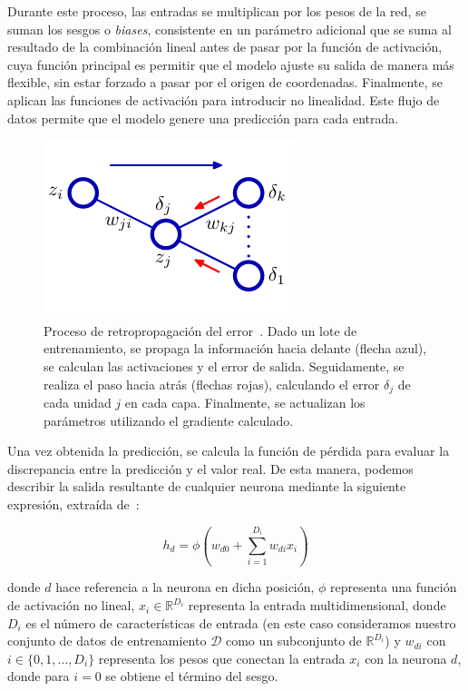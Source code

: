 Durante este proceso, las entradas se multiplican por los pesos de la red, se suman los sesgos o \emph{biases}, consistente en un parámetro adicional que se suma al resultado de la combinación lineal antes de pasar por la función de activación, cuya función principal es permitir que el modelo ajuste su salida de manera más flexible, sin estar forzado a pasar por el origen de coordenadas. Finalmente, se aplican las funciones de activación para introducir no linealidad. Este flujo de datos permite que el modelo genere una predicción para cada entrada.\newline

\begin{figure}[h]
    \centering
    \includegraphics[width=0.3\linewidth]{img/aprendizajegd.png}
    \caption[Proceso de retropropagación del error~\cite{Bishop2006}.]{Proceso de retropropagación del error~\cite{Bishop2006}. Dado un lote de entrenamiento, se propaga la información hacia delante (flecha azul), se calculan las activaciones y el error de salida. Seguidamente, se realiza el paso hacia atrás (flechas rojas), calculando el error $\delta_j$ de cada unidad $j$ en cada capa. Finalmente, se actualizan los parámetros utilizando el gradiente calculado.}\label{fig:aprendizajegd}
\end{figure}

Una vez obtenida la predicción, se calcula la función de pérdida para evaluar la discrepancia entre la predicción y el valor real. De esta manera, podemos describir la salida resultante de cualquier neurona mediante la siguiente expresión, extraída de~\cite{Prince2023}:

\begin{equation}
    h_d = \phi \left( w_{d0} + \sum_{i=1}^{D_i} w_{di} x_i \right)
    \label{eq:hidden_unit}
\end{equation}

donde $d$ hace referencia a la neurona en dicha posición, $\phi$ representa una función de activación no lineal, $x_i \in \mathbb{R}^{D_i}$ representa la entrada multidimensional, donde $D_i$ es el número de características de entrada (en este caso consideramos nuestro conjunto de datos de entrenamiento $\mathcal{D}$ como un subconjunto de $\mathbb{R}^{D_i}$) y $w_{di}$ con $i \in \{0,1,\ldots,D_i\}$ representa los pesos que conectan la entrada $x_i$ con la neurona $d$, donde para $i = 0$ se obtiene el término del sesgo.\newline

